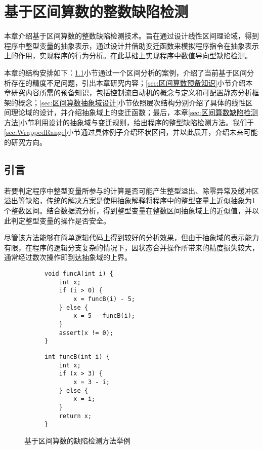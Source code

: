 
\chapter{基于区间算数的整数缺陷检测}
\label{sec:区间算数}

本章介绍基于区间算数的整数缺陷检测技术。旨在通过设计线性区间理论域，得到程序中整型变量的抽象表示，通过设计并借助变迁函数来模拟程序指令在抽象表示上的作用，实现程序的行为分析。在此基础上实现程序中数值导向型缺陷检测。

本章的结构安排如下：\ref{sec:区间算数引言}小节通过一个区间分析的案例，介绍了当前基于区间分析存在的精度不足问题，引出本章研究内容；\ref{sec:区间算数预备知识}小节介绍本章研究内容所需的预备知识，包括控制流自动机的概念与定义和可配置静态分析框架的概念；\ref{sec:区间算数抽象域设计}小节依照层次结构分别介绍了具体的线性区间理论域的设计，并介绍抽象域上的变迁函数；最后，本章\ref{sec:区间算数缺陷检测方法}小节利用设计的抽象域与变迁规则，给出程序的整型缺陷检测方法。我们于\ref{sec:WrappedRange}小节通过具体例子介绍环状区间，并以此展开，介绍未来可能的研究方向。


\section{引言}
\label{sec:区间算数引言}

若要判定程序中整型变量所参与的计算是否可能产生整型溢出、除零异常及缓冲区溢出等缺陷，传统的解决方案是使用抽象解释将程序中的整型变量上近似抽象为1个整数区间。结合数据流分析，得到整型变量在整数区间抽象域上的近似值，并以此判定整型变量的操作是否安全。

尽管该方法能够在简单逻辑代码上得到较好的分析效果，但由于抽象域的表示能力有限，在程序的逻辑分支复杂的情况下，因状态合并操作所带来的精度损失较大，通常经过数次操作即到达抽象域的上界。

\begin{figure}[htb]
	\begin{subfigure}[b]{.5\linewidth}
			\begin{lstlisting}[xleftmargin=.15\textwidth]
void funcA(int i) {
	int x;
	if (i > 0) {
		x = funcB(i) - 5;
	} else {
		x = 5 - funcB(i);
	}
	assert(x != 0);
}
			\end{lstlisting}
	\end{subfigure}
	\begin{subfigure}[b]{.5\linewidth}
			\begin{lstlisting}[xleftmargin=.25\textwidth]
int funcB(int i) {
	int x;
	if (x > 3) {
		x = 3 - i;
	} else {
		x = i;
	}
	return x;
}
			\end{lstlisting}
\end{subfigure}
	\caption{基于区间算数的缺陷检测方法举例}
	\label{fig:codeExampleForSignRange}
\end{figure}{\tiny }

